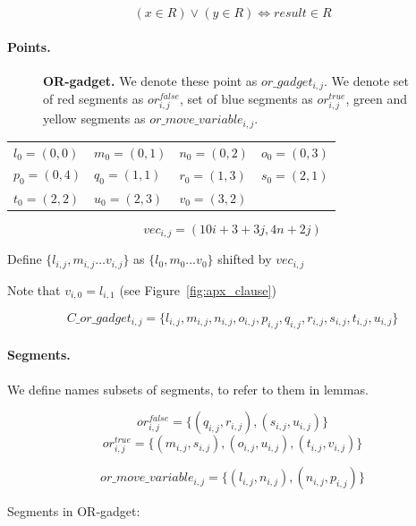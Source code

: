 $$ (x \in R) \lor (y \in R) \iff result \in R  $$

\paragraph{Points.}

\begin{figure}[h]
\centering
\def\svgwidth{0.5\columnwidth}

\caption{
\textbf{OR-gadget.} We denote these point as $or\_gadget_{i, j}$. 
We denote set of red segments as $or^{false}_{i, j}$,
set of blue segments as $or^{true}_{i, j}$,
green and yellow segments as $or\_move\_variable_{i, j}$.
}
\label{fig:apx_or_gadget}
\end{figure}

	\begin{center}
\begin{tabular}{ l l l l}

	$l_0 = (0, 0)$ &
	$m_0 = (0, 1)$ &
	$n_0 = (0, 2)$ &
	$o_0 = (0, 3)$ \\
	$p_0 = (0, 4)$ &
	$q_0 = (1, 1)$ &
	$r_0 = (1, 3)$ &
	$s_0 = (2, 1)$ \\
	$t_0 = (2, 2)$ &
	$u_0 = (2, 3)$ &
	$v_0 = (3, 2)$ &
\end{tabular}
\end{center}


	$$vec_{i, j} = (10i + 3 + 3j, 4n + 2j)$$
	
	Define 
	$\{ l_{i, j}, m_{i, j} \ldots v_{i, j} \}$
	as $\{l_0, m_0 \ldots v_0\}$ shifted by $vec_{i, j}$

Note that $v_{i, 0} = l_{i, 1}$ (see Figure~\ref{fig:apx_clause})
 
  $$C\_or\_gadget_{i, j} = 
 \{l_{i, j}, m_{i, j}, n_{i, j}, o_{i, j},
 p_{i, j}, q_{i, j}, r_{i, j}, s_{i, j}, t_{i, j}, u_{i, j} \}
 $$
 
\paragraph{Segments.}

We define names subsets of segments, to refer to them in lemmas.
 
$$or^{false}_{i, j} =
\{ (q_{i, j}, r_{i, j}), (s_{i, j}, u_{i, j})\}$$
$$or^{true}_{i, j} =
\{ (m_{i, j}, s_{i, j}), (o_{i, j}, u_{i, j}),
(t_{i, j}, v_{i, j}) \}$$

$$or\_move\_variable_{i, j} =
\{ (l_{i, j}, n_{i, j}), (n_{i, j}, p_{i, j})\}$$

Segments in OR-gadget:


